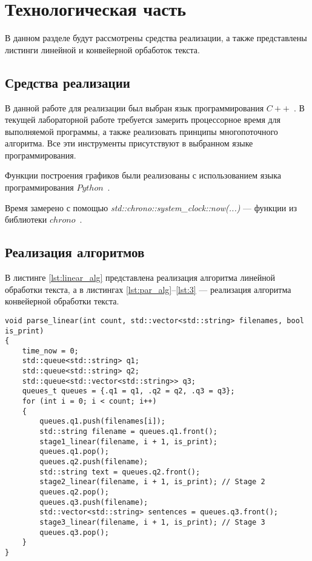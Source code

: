 \chapter{Технологическая часть}

В данном разделе будут рассмотрены средства реализации, а также представлены листинги линейной и конвейерной орбаботок текста.

\section{Средства реализации}
В данной работе для реализации был выбран язык программирования $C++$~\cite{cpp-lang}. 
В текущей лабораторной работе требуется замерить процессорное время для выполняемой программы, а также реализовать принципы многопоточного алгоритма. 
Все эти инструменты присутствуют в выбранном языке программирования. 

Функции построения графиков были реализованы с использованием языка программирования $Python$~\cite{python-lang}.

Время замерено с помощью \textit{std::chrono::system\_clock::now(...)} --- функции из библиотеки $chrono$~\cite{cpp-lang-chrono}.


\section{Реализация алгоритмов}

В листинге \ref{lst:linear_alg} представлена реализация алгоритма линейной обработки текста, а в листингах \ref{lst:par_alg}--\ref{lst:3} --- реализация алгоритма конвейерной обработки текста.

\clearpage

\begin{center}
    \captionsetup{justification=raggedright,singlelinecheck=off}
    \begin{lstlisting}[label=lst:linear_alg,caption=Алгоритм линейной обработки текста]
void parse_linear(int count, std::vector<std::string> filenames, bool is_print)
{
	time_now = 0;
	std::queue<std::string> q1;
	std::queue<std::string> q2;
	std::queue<std::vector<std::string>> q3;
	queues_t queues = {.q1 = q1, .q2 = q2, .q3 = q3};
	for (int i = 0; i < count; i++)
	{
		queues.q1.push(filenames[i]);
		std::string filename = queues.q1.front();
		stage1_linear(filename, i + 1, is_print);
		queues.q1.pop();
		queues.q2.push(filename);
		std::string text = queues.q2.front();
		stage2_linear(filename, i + 1, is_print); // Stage 2
		queues.q2.pop();
		queues.q3.push(filename);
		std::vector<std::string> sentences = queues.q3.front();
		stage3_linear(filename, i + 1, is_print); // Stage 3
		queues.q3.pop();
	}
}
\end{lstlisting}
\end{center}

